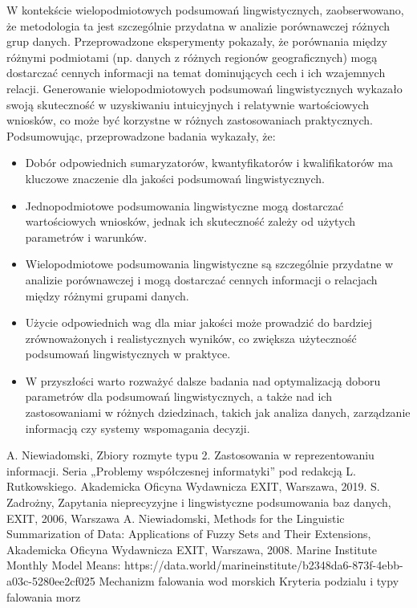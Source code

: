 \documentclass{article}
\begin{document}
\noindent W kontekście wielopodmiotowych podsumowań lingwistycznych, zaobserwowano, że metodologia ta jest szczególnie przydatna w analizie porównawczej różnych grup danych. Przeprowadzone eksperymenty pokazały, że porównania między różnymi podmiotami (np. danych z różnych regionów geograficznych) mogą dostarczać cennych informacji na temat dominujących cech i ich wzajemnych relacji. Generowanie wielopodmiotowych podsumowań lingwistycznych wykazało swoją skuteczność w uzyskiwaniu intuicyjnych i relatywnie wartościowych wniosków, co może być korzystne w różnych zastosowaniach praktycznych. \\

\newpage
Podsumowując, przeprowadzone badania wykazały, że:
\begin{itemize}
    \item Dobór odpowiednich sumaryzatorów, kwantyfikatorów i kwalifikatorów ma kluczowe znaczenie dla jakości podsumowań lingwistycznych.
    \item Jednopodmiotowe podsumowania lingwistyczne mogą dostarczać wartościowych wniosków, jednak ich skuteczność zależy od użytych parametrów i warunków.
    \item Wielopodmiotowe podsumowania lingwistyczne są szczególnie przydatne w analizie porównawczej i mogą dostarczać cennych informacji o relacjach między różnymi grupami danych.
    \item Użycie odpowiednich wag dla miar jakości może prowadzić do bardziej zrównoważonych i realistycznych wyników, co zwiększa użyteczność podsumowań lingwistycznych w praktyce.
    \item W przyszłości warto rozważyć dalsze badania nad optymalizacją doboru parametrów dla podsumowań lingwistycznych, a także nad ich zastosowaniami w różnych dziedzinach, takich jak analiza danych, zarządzanie informacją czy systemy wspomagania decyzji.
\end{itemize}




\begin{thebibliography}{99}
  A. Niewiadomski, Zbiory rozmyte typu 2. Zastosowania w reprezentowaniu informacji.  Seria „Problemy współczesnej informatyki” pod redakcją L. Rutkowskiego. Akademicka Oficyna Wydawnicza EXIT, Warszawa, 2019.
 S. Zadrożny, Zapytania nieprecyzyjne i lingwistyczne podsumowania baz danych, EXIT, 2006, Warszawa
 A. Niewiadomski, Methods for the Linguistic Summarization of Data: Applications of Fuzzy Sets and Their Extensions, Akademicka Oficyna Wydawnicza EXIT, Warszawa, 2008.
 Marine Institute Monthly Model Means: https://data.world/marineinstitute/b2348da6-873f-4ebb-a03c-5280ee2cf025
 Mechanizm falowania wod morskich Kryteria podzialu i typy falowania morz
\end{thebibliography}
\end{document}
